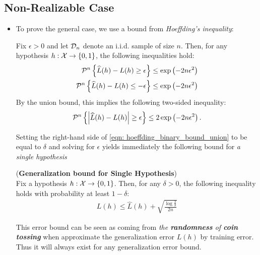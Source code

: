 \documentclass[11pt]{article}
\begin{document}
\subsection{Non-Realizable Case}
\begin{itemize}
\item To prove the general case, we use a bound from \emph{Hoeffding's inequality}:
\begin{proposition}
Fix $\epsilon > 0$ and let ${\mathcal D}_{n}$ denote an i.i.d. sample of size $n$. Then, for any hypothesis $h: {\mathcal X} \to \left\{0, 1\right\}$, the following inequalities hold:
\begin{align}
{\mathcal P}^n\left\{\widehat{L}(h)  - L(h) \ge \epsilon\right\} \le \exp\left(-2n\epsilon^2\right) \label{eqn: hoeffding_binary_bound_1}\\
{\mathcal P}^n\left\{\widehat{L}(h)  - L(h) \le -\epsilon\right\} \le \exp\left(-2n\epsilon^2\right) \label{eqn: hoeffding_binary_bound_2}
\end{align}
By the union bound, this implies the following two-sided inequality:
\begin{align}
{\mathcal P}^n\left\{\left\lvert \widehat{L}(h)  - L(h) \right\rvert \ge \epsilon\right\} \le 2\exp\left(-2n\epsilon^2\right). \label{eqn: hoeffding_binary_bound_union}
\end{align}
\end{proposition}
Setting the right-hand side of \eqref{eqn: hoeffding_binary_bound_union} to be equal to $\delta$ and solving for $\epsilon$ yields immediately the following bound for \emph{a single hypothesis}

\begin{corollary} (\textbf{Generalization bound for Single Hypothesis})  \citep{mohri2018foundations}\\
Fix a hypothesis $h: {\mathcal X} \to \left\{0, 1\right\}$. Then, for any $\delta > 0$, the following inequality holds with probability at least $1 - \delta$:
\begin{align}
 L(h) \le  \widehat{L}(h) + \sqrt{\frac{\log\frac{2}{\delta}}{2n}}  \label{eqn: pac_one_hypothesis}
\end{align}
\end{corollary} This error bound can be seen as coming from \emph{the \textbf{randomness} of \textbf{coin tossing}} when approximate the generalization error $L(h)$ by training error. Thus it will always exist for any generalization error bound. 


\end{itemize}
\end{document}
